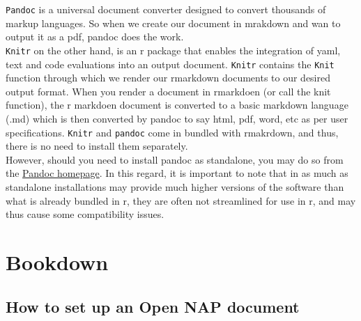 \documentclass[
]{book}
\begin{document}
\texttt{Pandoc} is a universal document converter designed to convert thousands of markup languages. So when we create our document in mrakdown and wan to output it as a pdf, pandoc does the work.\\
\texttt{Knitr} on the other hand, is an r package that enables the integration of yaml, text and code evaluations into an output document. \texttt{Knitr} contains the \texttt{Knit} function through which we render our rmarkdown documents to our desired output format.
When you render a document in rmarkdoen (or call the knit function), the r markdoen document is converted to a basic markdown language (.md) which is then converted by pandoc to say html, pdf, word, etc as per user specifications.
\texttt{Knitr} and \texttt{pandoc} come in bundled with rmakrdown, and thus, there is no need to install them separately.\\
However, should you need to install pandoc as standalone, you may do so from the \href{http://pandoc.org}{Pandoc homepage}. In this regard, it is important to note that in as much as standalone installations may provide much higher versions of the software than what is already bundled in r, they are often not streamlined for use in r, and may thus cause some compatibility issues.

\hypertarget{bookdown}{%
\chapter{Bookdown}\label{bookdown}}

\hypertarget{how-to-set-up-an-open-nap-document}{%
\section{How to set up an Open NAP document}\label{how-to-set-up-an-open-nap-document}}
\end{document}
